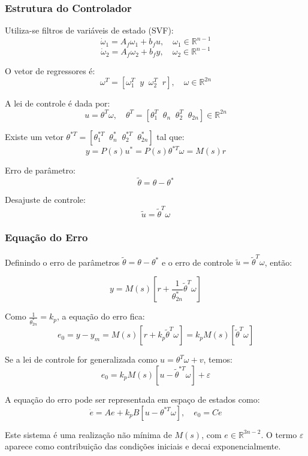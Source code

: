 \documentclass[10pt]{article}
\begin{document}
\subsubsection{Estrutura do Controlador}

Utiliza-se filtros de variáveis de estado (SVF):
\[
\dot{\omega}_1 = A_f \omega_1 + b_f u, \quad \omega_1 \in \mathbb{R}^{n-1}
\]
\[
\dot{\omega}_2 = A_f \omega_2 + b_f y, \quad \omega_2 \in \mathbb{R}^{n-1}
\]

O vetor de regressores é:
\[
\omega^T = [\omega_1^T \;\; y \;\; \omega_2^T \;\; r], \quad \omega \in \mathbb{R}^{2n}
\]

A lei de controle é dada por:
\[
u = \theta^T \omega, \quad \theta^T = [\theta_1^T \;\; \theta_n \;\; \theta_2^T \;\; \theta_{2n}] \in \mathbb{R}^{2n}
\]

Existe um vetor \( \theta^{*T}= [\theta_1^{*T} \;\; \theta_n^{*} \;\; \theta_2^{*T} \;\; \theta_{2n}^{*}]  \) tal que:
\[
y = P(s)u^* = P(s)\theta^{*T} \omega = M(s)r
\]

Erro de parâmetro:
\[ \tilde{\theta} = \theta - \theta^* \]

Desajuste de controle: 
\[ \tilde{u} = \tilde{\theta}^T \omega \]

\subsubsection{Equação do Erro}

Definindo o erro de parâmetros \( \tilde{\theta} = \theta - \theta^* \) e o erro de controle \( \tilde{u} = \tilde{\theta}^T \omega \), então:

\[
y = M(s) \left[ r + \frac{1}{\theta^*_{2n}} \tilde{\theta}^T \omega \right]
\]

Como \( \frac{1}{\theta^*_{2n}} = k_p \), a equação do erro fica:
\[
e_0 = y - y_m = M(s)\left[r + k_p \tilde{\theta}^T \omega\right] = k_p M(s) \left[\tilde{\theta}^T \omega \right]
\]

Se a lei de controle for generalizada como \( u = \theta^T \omega + v \), temos:
\[
e_0 = k_p M(s) \left[u - \tilde{\theta}^{*T} \omega \right] + \varepsilon
\]

A equação do erro pode ser representada em espaço de estados como:
\[
\dot{e} = A e + k_p B [u - \theta^{*T} \omega], \quad e_0 = C e
\]

Este sistema é uma realização não mínima de \( M(s) \), com \( e \in \mathbb{R}^{3n - 2} \). O termo \( \varepsilon \) aparece como contribuição das condições iniciais e decai exponencialmente.
\end{document}
